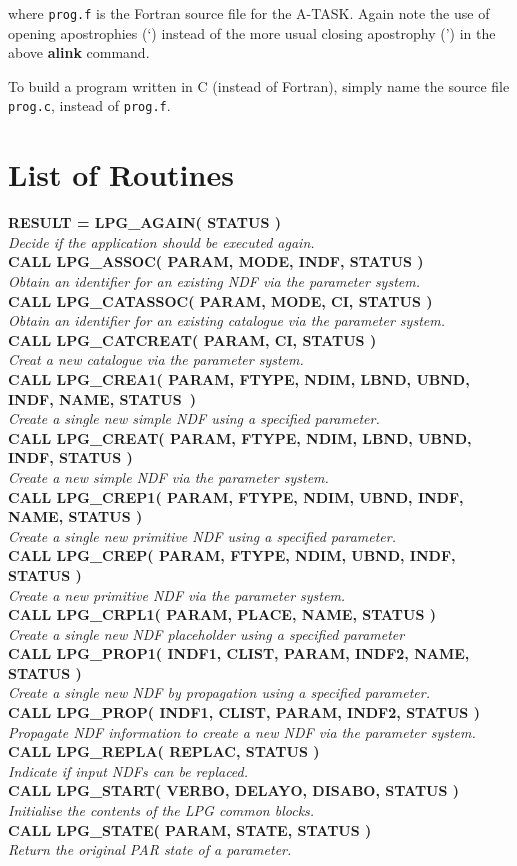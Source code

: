 \documentclass[twoside,11pt]{starlink}
\providecommand{\noteroutine}[2]{{\small \textbf{#1}} \\
                              \hspace*{3em} \emph{#2} \\[1.5ex]}
\begin{document}
\begin{small}
\begin{terminalv}
\end{terminalv}
\end{small}

where \texttt{prog.f} is the Fortran source file for the A-TASK. Again
note the use of opening apostrophies (`) instead of the more usual
closing apostrophy (') in the above \textbf{alink} command.

To build a program written in C (instead of Fortran), simply name the
source file \texttt{prog.c}, instead of \texttt{prog.f}.

\newpage
\appendix

\section{List of Routines}

\noteroutine{RESULT = LPG\_AGAIN( STATUS )}
   {Decide if the application should be executed again.}
\noteroutine{CALL LPG\_ASSOC( PARAM, MODE, INDF, STATUS )}
   {Obtain an identifier for an existing NDF via the parameter system.}
\noteroutine{CALL LPG\_CATASSOC( PARAM, MODE, CI, STATUS )}
   {Obtain an identifier for an existing catalogue via the parameter system.}
\noteroutine{CALL LPG\_CATCREAT( PARAM, CI, STATUS )}
   {Creat a new catalogue via the parameter system.}
\noteroutine{CALL LPG\_CREA1( PARAM, FTYPE, NDIM, LBND, UBND, INDF, NAME, STATUS~)}
   {Create a single new simple NDF using a specified parameter.}
\noteroutine{CALL LPG\_CREAT( PARAM, FTYPE, NDIM, LBND, UBND, INDF, STATUS )}
   {Create a new simple NDF via the parameter system.}
\noteroutine{CALL LPG\_CREP1( PARAM, FTYPE, NDIM, UBND, INDF, NAME, STATUS )}
   {Create a single new primitive NDF using a specified parameter.}
\noteroutine{CALL LPG\_CREP( PARAM, FTYPE, NDIM, UBND, INDF, STATUS )}
   {Create a new primitive NDF via the parameter system.}
\noteroutine{CALL LPG\_CRPL1( PARAM, PLACE, NAME, STATUS )}
   {Create a single new NDF placeholder using a specified parameter}
\noteroutine{CALL LPG\_PROP1( INDF1, CLIST, PARAM, INDF2, NAME, STATUS )}
   {Create a single new NDF by propagation using a specified parameter.}
\noteroutine{CALL LPG\_PROP( INDF1, CLIST, PARAM, INDF2, STATUS )}
   {Propagate NDF information to create a new NDF via the parameter system.}
\noteroutine{CALL LPG\_REPLA( REPLAC, STATUS )}
   {Indicate if input NDFs can be replaced.}
\noteroutine{CALL LPG\_START( VERBO, DELAYO, DISABO, STATUS )}
   {Initialise the contents of the LPG common blocks.}
\noteroutine{CALL LPG\_STATE( PARAM, STATE, STATUS )}
   {Return the original PAR state of a parameter.}
\end{document}
